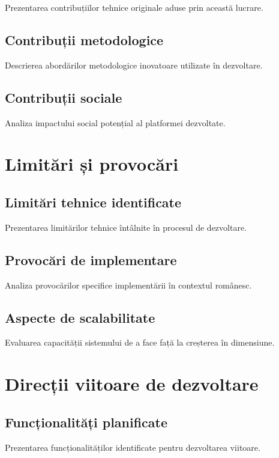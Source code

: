 \documentclass[12pt,a4paper]{report}
\begin{document}
Prezentarea contribuțiilor tehnice originale aduse prin această lucrare.

\subsection{Contribuții metodologice}

Descrierea abordărilor metodologice inovatoare utilizate în dezvoltare.

\subsection{Contribuții sociale}

Analiza impactului social potențial al platformei dezvoltate.

\section{Limitări și provocări}

\subsection{Limitări tehnice identificate}

Prezentarea limitărilor tehnice întâlnite în procesul de dezvoltare.

\subsection{Provocări de implementare}

Analiza provocărilor specifice implementării în contextul românesc.

\subsection{Aspecte de scalabilitate}

Evaluarea capacității sistemului de a face față la creșterea în dimensiune.

\section{Direcții viitoare de dezvoltare}

\subsection{Funcționalități planificate}

Prezentarea funcționalităților identificate pentru dezvoltarea viitoare.
\end{document}

